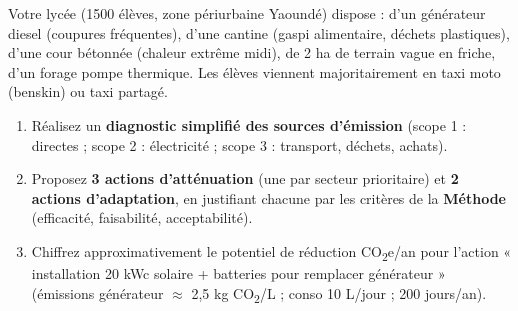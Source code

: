 \documentclass[11pt]{article}
\begin{document}
\begin{exercice}
Votre lycée (1500 élèves, zone périurbaine Yaoundé) dispose : d'un générateur diesel (coupures fréquentes), d'une cantine (gaspi alimentaire, déchets plastiques), d'une cour bétonnée (chaleur extrême midi), de 2 ha de terrain vague en friche, d'un forage pompe thermique. Les élèves viennent majoritairement en taxi moto (benskin) ou taxi partagé.
\begin{enumerate}
    \item Réalisez un \textbf{diagnostic simplifié des sources d'émission} (scope 1 : directes ; scope 2 : électricité ; scope 3 : transport, déchets, achats).
    \item Proposez \textbf{3 actions d'atténuation} (une par secteur prioritaire) et \textbf{2 actions d'adaptation}, en justifiant chacune par les critères de la \textbf{Méthode} (efficacité, faisabilité, acceptabilité).
    \item Chiffrez approximativement le potentiel de réduction CO\textsubscript{2}e/an pour l'action « installation 20 kWc solaire + batteries pour remplacer générateur » (émissions générateur $\approx$ 2,5 kg CO\textsubscript{2}/L ; conso 10 L/jour ; 200 jours/an).
\end{enumerate}
\end{exercice}
\end{document}
